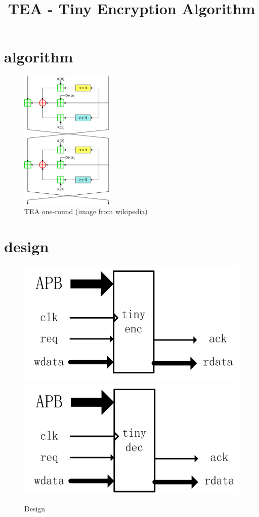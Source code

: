 \documentclass[10pt]{article}
\begin{document}
\title{TEA - Tiny Encryption Algorithm}
\maketitle
\tableofcontents



\section{algorithm}

\begin{figure}[H]
\centering
\includegraphics[width=0.4\textwidth]{TEA_InfoBox_Diagram.png}
\caption{TEA one-round (image from wikipedia)}
\label{TEA_InfoBox_Diagram.png}
\end{figure}



\section{design}

\begin{figure}[H]
\centering
\includegraphics[height=0.2\textwidth]{20250805121912_711x381_scrot.png}
\includegraphics[height=0.2\textwidth]{20250805121919_706x364_scrot.png}
\caption{Design}
\label{20250805121619_706x366_scrot.png}
\end{figure}
\end{document}
